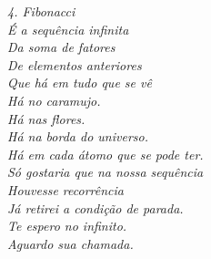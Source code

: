 \clearpage
\thispagestyle{empty}

\vspace*{\fill}

\begin{flushright}
    \itshape
    4. Fibonacci \\[0.5cm]

    É a sequência infinita \\
    Da soma de fatores \\
    De elementos anteriores \\
    Que há em tudo que se vê \\
    [\baselineskip]
    Há no caramujo. \\
    Há nas flores. \\
    Há na borda do universo. \\
    Há em cada átomo que se pode ter. \\
    [\baselineskip]
    Só gostaria que na nossa sequência \\
    Houvesse recorrência \\ \relax
    [recursiva \\
    Para que da nossa soma pudesse resultar \\
    Uma sequência única. Singular. \\
    [\baselineskip]
    Já retirei a condição de parada. \\
    Te espero no infinito. \\
    Aguardo sua chamada.
\end{flushright}

\clearpage
